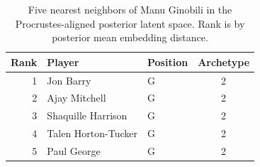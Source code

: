 \begin{table}[htbp]
  \centering\small
  \begin{tabular}{rllc}
    \toprule
    Rank & Player & Position & Archetype \\
    \midrule
    1 & Jon Barry & G & 2 \\
    2 & Ajay Mitchell & G & 2 \\
    3 & Shaquille Harrison & G & 2 \\
    4 & Talen Horton-Tucker & G & 2 \\
    5 & Paul George & G & 2 \\
    \bottomrule
  \end{tabular}
  \caption{Five nearest neighbors of Manu Ginobili in the Procrustes-aligned posterior latent space. Rank is by posterior mean embedding distance.}
  \label{tab:Manu_Ginobili_neighbors}
\end{table}

